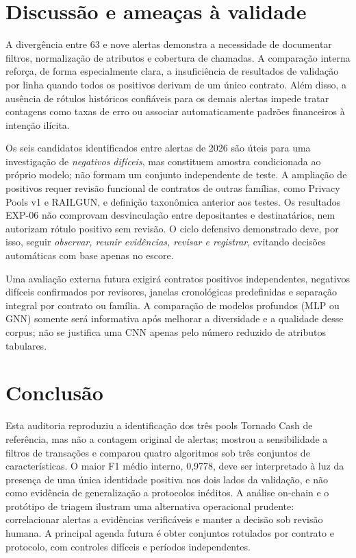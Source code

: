 \documentclass[12pt]{article}
\begin{document}
\section{Discussão e ameaças à validade}
A divergência entre 63 e nove alertas demonstra a necessidade de documentar filtros, normalização de atributos e cobertura de chamadas. A comparação interna reforça, de forma especialmente clara, a insuficiência de resultados de validação por linha quando todos os positivos derivam de um único contrato. Além disso, a ausência de rótulos históricos confiáveis para os demais alertas impede tratar contagens como taxas de erro ou associar automaticamente padrões financeiros à intenção ilícita.

Os seis candidatos identificados entre alertas de 2026 são úteis para uma investigação de \emph{negativos difíceis}, mas constituem amostra condicionada ao próprio modelo; não formam um conjunto independente de teste. A ampliação de positivos requer revisão funcional de contratos de outras famílias, como Privacy Pools v1 e RAILGUN, e definição taxonômica anterior aos testes. Os resultados EXP-06 não comprovam desvinculação entre depositantes e destinatários, nem autorizam rótulo positivo sem revisão. O ciclo defensivo demonstrado deve, por isso, seguir \emph{observar, reunir evidências, revisar e registrar}, evitando decisões automáticas com base apenas no escore.

Uma avaliação externa futura exigirá contratos positivos independentes, negativos difíceis confirmados por revisores, janelas cronológicas predefinidas e separação integral por contrato ou família. A comparação de modelos profundos (MLP ou GNN) somente será informativa após melhorar a diversidade e a qualidade desse corpus; não se justifica uma CNN apenas pelo número reduzido de atributos tabulares.

\section{Conclusão}
Esta auditoria reproduziu a identificação dos três pools Tornado Cash de referência, mas não a contagem original de alertas; mostrou a sensibilidade a filtros de transações e comparou quatro algoritmos sob três conjuntos de características. O maior F1 médio interno, 0,9778, deve ser interpretado à luz da presença de uma única identidade positiva nos dois lados da validação, e não como evidência de generalização a protocolos inéditos. A análise on-chain e o protótipo de triagem ilustram uma alternativa operacional prudente: correlacionar alertas a evidências verificáveis e manter a decisão sob revisão humana. A principal agenda futura é obter conjuntos rotulados por contrato e protocolo, com controles difíceis e períodos independentes.
\end{document}
